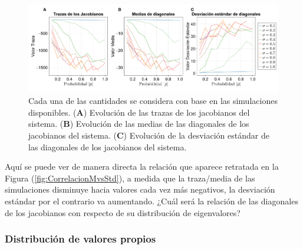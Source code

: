 \begin{figure}[h!]
	\centering
	\includegraphics[scale=0.15]{../Imagenes/TrMedStd}
	\caption{Cada una de las cantidades se considera con base en las simulaciones disponibles. (\textbf{A}) Evolución de las trazas de los jacobianos del sistema. (\textbf{B}) Evolución de las medias de las diagonales de los jacobianos del sistema. (\textbf{C}) Evolución de la desviación estándar de las diagonales de los jacobianos del sistema.}
	\label{fig:TrMedStd}
\end{figure}

Aquí se puede ver de manera directa la relación que aparece retratada en la Figura (\ref{fig:CorrelacionMvsStd}), a medida que la traza/media de las simulaciones disminuye hacia valores cada vez más negativos, la desviación estándar por el contrario va aumentando. ¿Cuál será la relación de las diagonales de los jacobianos con respecto de su distribución de eigenvalores?

\subsubsection*{Distribución de valores propios}

